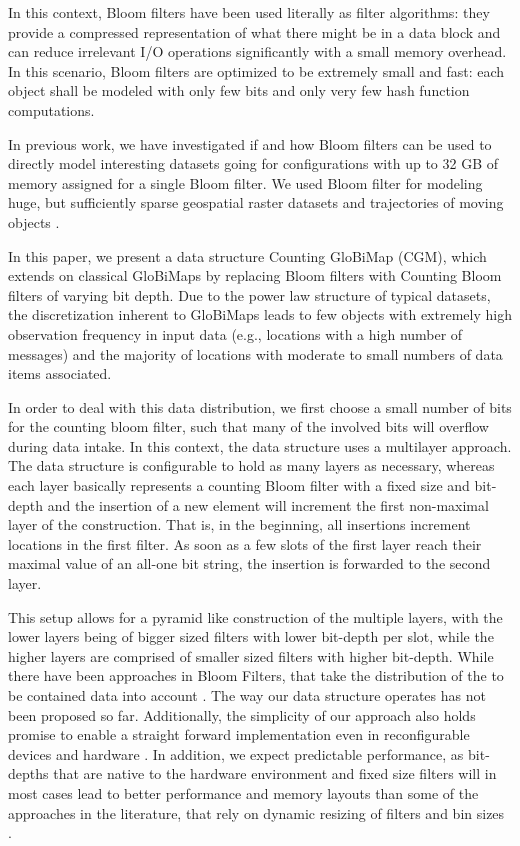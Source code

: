\documentclass[sigconf, nonacm]{acmart}
\begin{document}
In this context, Bloom filters have been used literally as filter algorithms: they provide a compressed representation of what there might be in a data block and can reduce irrelevant I/O operations significantly with a small memory overhead. In this scenario, Bloom filters are optimized to be extremely small and fast: each object shall be modeled with only few bits and only very few hash function computations.

In previous work, we have investigated if and how Bloom filters can be used to directly model interesting datasets going for configurations with up to 32 GB of memory assigned for a single Bloom filter. We used Bloom filter for modeling huge, but sufficiently sparse geospatial raster datasets \cite{werner2019globimaps, werner2021globimapsai} and trajectories of moving objects \cite{werner2015bacr}.

In this paper, we present a data structure Counting GloBiMap (CGM), which extends on classical GloBiMaps \cite{werner2019globimaps} by replacing
Bloom filters with Counting Bloom filters of varying bit depth. Due to the power law structure of typical datasets, the discretization inherent to
GloBiMaps leads to few objects with extremely high observation frequency in input data (e.g., locations with a high number of messages) and the majority of locations with moderate to small numbers of data items associated.

In order to deal with this data distribution, we first choose a small number of bits for the counting bloom filter, such that many of the involved bits will overflow during data intake. In this context, the data structure uses a multilayer approach. The data structure is configurable to hold as many layers as necessary, whereas each layer basically represents a counting Bloom filter with a fixed size and bit-depth and the insertion of a new element will increment the first non-maximal layer of the construction. That is, in the beginning, all insertions increment locations in the first filter. As soon as a few slots of the first layer reach their maximal value of an all-one bit string, the insertion is forwarded to the second layer.

This setup allows for a pyramid like construction of the multiple layers, with the lower layers being of bigger sized filters with lower bit-depth per slot, while the higher layers are comprised of smaller sized filters with higher bit-depth. While there have been approaches in Bloom Filters, that take the distribution of the to be contained data into account \cite{ficara_multilayer_2008} \cite{bruck2006weighted}. The way our data structure operates has not been proposed so far. Additionally, the simplicity of our approach also holds promise to enable a straight forward implementation even in reconfigurable devices and hardware \cite{cho2014fpga, ramachandran2015fpga, harwayne2009fpga}. In addition, we expect predictable performance, as bit-depths that are native to the hardware environment and fixed size filters will in most cases lead to better performance and memory layouts than some of the approaches in the literature, that rely on dynamic resizing of filters and bin sizes \cite{guo2009dynamic}.
\end{document}
